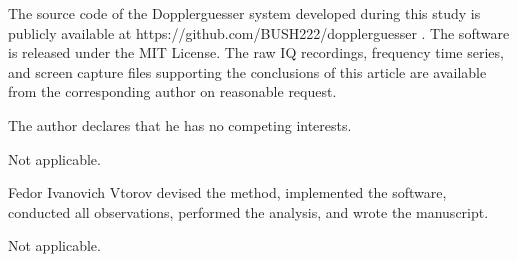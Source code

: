 \documentclass[lineno,pdflatex,sn-basic,referee,]{sn-jnl}
\begin{document}
The source code of the Dopplerguesser system developed during this study is publicly available at https://github.com/BUSH222/dopplerguesser \citep{dopplerguesser}. The software is released under the MIT License. The raw IQ recordings, frequency time series, and screen capture files supporting the conclusions of this article are available from the corresponding author on reasonable request.

The author declares that he has no competing interests.

Not applicable.

Fedor Ivanovich Vtorov devised the method, implemented the software, conducted all observations, performed the analysis, and wrote the manuscript.

Not applicable.

\end{document}

